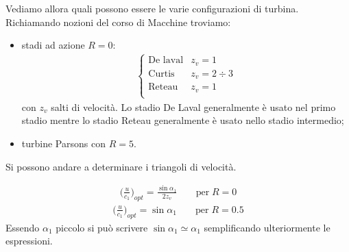 Vediamo allora quali possono essere le varie configurazioni di turbina. Richiamando nozioni del corso di Macchine troviamo:
\begin{itemize}
	\item stadi ad azione $R = 0$:
	\begin{align*}
	\begin{cases}
	\mbox{De laval} & z_v = 1\\
	\mbox{Curtis} & z_v = 2 \div 3\\
	\mbox{Reteau} & z_v = 1\\
	\end{cases}
	\end{align*}
	con $z_v$ salti di velocità. Lo stadio De Laval generalmente è usato nel primo stadio mentre lo stadio Reteau generalmente è usato nello stadio intermedio;
	\item turbine Parsons con $R = 5$.
\end{itemize}
Si possono andare a determinare i triangoli di velocità.

\begin{align*}
\bigg( \frac{u}{c_1} \bigg)_{opt} = \frac{\sin \alpha_1}{2 z_v} \;\;\;\;\;\;\; \mbox{per} \; R = 0
\end{align*}
\begin{align*}
\bigg( \frac{u}{c_1} \bigg)_{opt} = \sin \alpha_1 \;\;\;\;\;\;\; \mbox{per} \; R = 0.5
\end{align*}
Essendo $\alpha_1$ piccolo si può scrivere $ \sin \alpha_1 \simeq \alpha_1$ semplificando ulteriormente le espressioni.

